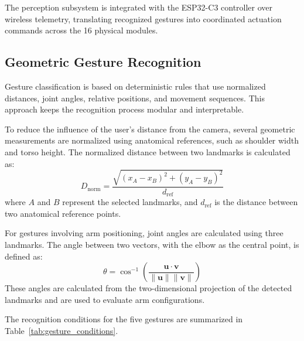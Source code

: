 \documentclass[lettersize,journal]{IEEEtran}
\begin{document}
	The perception subsystem is integrated with the ESP32-C3 controller over wireless telemetry, translating recognized gestures into coordinated actuation commands across the 16 physical modules.
	
	\subsection{Geometric Gesture Recognition}
	
	Gesture classification is based on deterministic rules that use normalized distances, joint angles, relative positions, and movement sequences. This approach keeps the recognition process modular and interpretable.

	To reduce the influence of the user's distance from the camera, several geometric measurements are normalized using anatomical references, such as shoulder width and torso height. The normalized distance between two landmarks is calculated as:
	\begin{equation}
		D_{\text{norm}} = \frac{\sqrt{(x_A - x_B)^2 + (y_A - y_B)^2}}{d_{\text{ref}}}
	\end{equation}
	where $A$ and $B$ represent the selected landmarks, and $d_{\text{ref}}$ is the distance between two anatomical reference points.
	
	For gestures involving arm positioning, joint angles are calculated using three landmarks. The angle between two vectors, with the elbow as the central point, is defined as:
	\begin{equation}
		\theta = \cos^{-1}\left( \frac{\mathbf{u} \cdot \mathbf{v}}{\|\mathbf{u}\| \|\mathbf{v}\|} \right)
	\end{equation}
	These angles are calculated from the two-dimensional projection of the detected landmarks and are used to evaluate arm configurations.
	
	The recognition conditions for the five gestures are summarized in Table~\ref{tab:gesture_conditions}.
\end{document}
